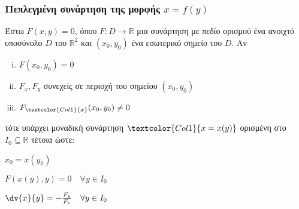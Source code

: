     \subsubsection{Πεπλεγμένη συνάρτηση της μορφής \ensuremath{x=f(y)}}

    Έστω $ F(x,y) = 0 $, όπου $ F\colon D \to \mathbb{R} $ μια συνάρτηση με πεδίο
    ορισμού ένα ανοιχτό υποσύνολο $D$ του $\mathbb{R}^{2}$ και $ (x_0,y_0) $ ένα 
    εσωτερικό σημείο του $D$.  Αν 
    \begin{enumerate}[(i)]
      \item $F(x_0,y_0) = 0$ 
      \item $ F_x, F_y$ συνεχείς σε περιοχή του σημείου $ (x_0,y_0) $ 
      \item $ F_{\textcolor{Col1}{x}}(x_0,y_0) \neq 0 $
    \end{enumerate}
    τότε υπάρχει μοναδική συνάρτηση $ \textcolor{Col1}{x=x(y)} $ ορισμένη στο $ I_0 \subseteq \mathbb{R} $ 
    τέτοια ώστε:
    \begin{myitemize}
      \item $x_0 = x(y_0)$
      \item $F(x(y),y) = 0 \quad \forall y \in I_0$
      \item $ \dv{x}{y} = - \frac{F_y}{F_x} \quad \forall y \in I_0  $
    \end{myitemize}

